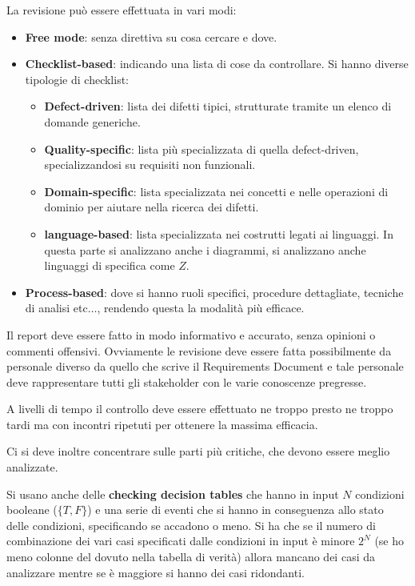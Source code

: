 La revisione può essere effettuata in vari modi:
\begin{itemize}
      \item \textbf{Free mode}: senza direttiva su cosa cercare e dove.
      \item \textbf{Checklist-based}: indicando una lista di cose da controllare.
            Si hanno diverse tipologie di checklist:
            \begin{itemize}
                  \item \textbf{Defect-driven}: lista dei difetti tipici,
                        strutturate tramite un elenco di domande generiche.
                  \item \textbf{Quality-specific}: lista più specializzata di
                        quella defect-driven, specializzandosi su requisiti non funzionali.
                  \item \textbf{Domain-specific}: lista specializzata nei concetti e nelle
                        operazioni di dominio per aiutare nella ricerca dei difetti.
                  \item \textbf{language-based}: lista specializzata nei costrutti legati ai
                        linguaggi. In questa parte si analizzano anche i diagrammi, si
                        analizzano anche linguaggi di specifica come $Z$.
            \end{itemize}
      \item \textbf{Process-based}: dove si hanno ruoli specifici, procedure
            dettagliate, tecniche di analisi etc$\dots$, rendendo questa la
            modalità più efficace.
\end{itemize}
Il report deve essere fatto in modo informativo e accurato, senza opinioni o
commenti offensivi. Ovviamente le revisione deve essere fatta possibilmente da
personale diverso da quello che scrive il Requirements Document e tale personale
deve rappresentare tutti gli stakeholder con le varie conoscenze pregresse.

A livelli di tempo il controllo deve essere effettuato ne troppo presto ne troppo
tardi ma con incontri ripetuti per ottenere la massima efficacia.

Ci si deve inoltre concentrare sulle parti più critiche, che devono essere meglio
analizzate.

Si usano anche delle \textbf{checking decision tables} che hanno in input $N$
condizioni booleane ($\{T, F\}$) e una serie di eventi che si hanno in conseguenza
allo stato delle condizioni, specificando se accadono o meno. Si ha che se il
numero di combinazione dei vari casi specificati dalle condizioni in input è minore
$2^N$ (se ho meno colonne del dovuto nella tabella di verità) allora mancano dei
casi da analizzare mentre se è maggiore si hanno dei casi ridondanti.

